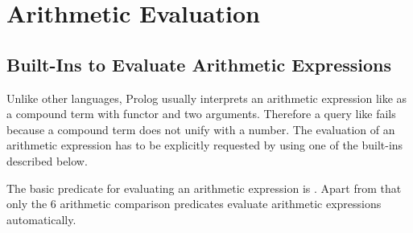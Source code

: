 %
%
%
%
%
%
%
%
%
%
\chapter{Arithmetic Evaluation\label{chaparith}}

\section{Built-Ins to Evaluate Arithmetic Expressions}
Unlike other languages, Prolog usually interprets an arithmetic expression like
 as a compound term with functor \notation{+} and two arguments.
Therefore a query like  fails because a compound term does
not
unify with a number. The evaluation of an arithmetic expression has to be
explicitly requested by using one of the built-ins described below.

%
The basic predicate for evaluating an arithmetic expression is
.
Apart from that only the 6 arithmetic comparison predicates evaluate
arithmetic expressions automatically.

